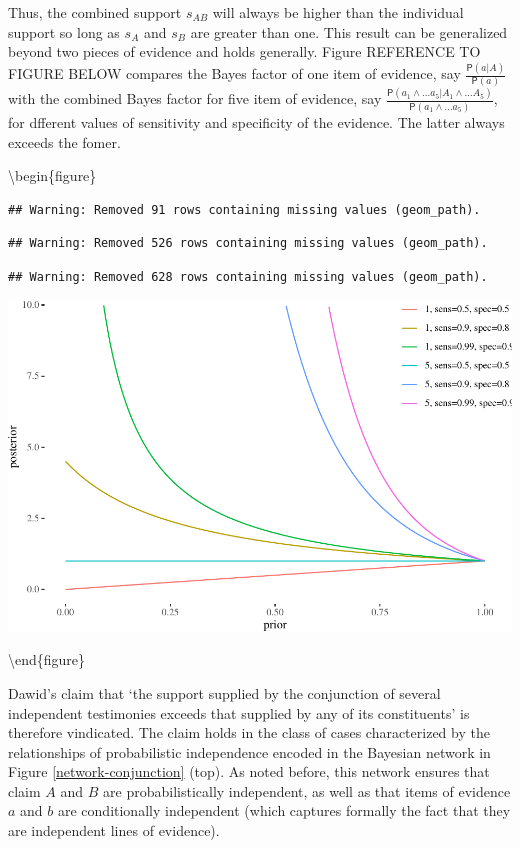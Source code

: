 \documentclass[10pt,dvipsnames,enabledeprecatedfontcommands]{scrartcl}
\newcommand{\pr}[1]{\mathsf{P}(#1)}
\begin{document}
\noindent  Thus, the combined support \(s_{AB}\) will always be higher
than the individual support so long as \(s_{A}\) and \(s_{B}\) are
greater than one. This result can be generalized beyond two pieces of
evidence and holds generally. Figure REFERENCE TO FIGURE BELOW compares
the Bayes factor of one item of evidence, say
\(\frac{\pr{a \vert A}}{\pr{a}}\) with the combined Bayes factor for
five item of evidence, say
\(\frac{\pr{a_1 \wedge \dots a_5 \vert A_1 \wedge \dots A_5}}{\pr{a_1\wedge \dots a_5}}\),
for dfferent values of sensitivity and specificity of the evidence. The
latter always exceeds the fomer.

\textbackslash{}begin\{figure\}

\begin{verbatim}
## Warning: Removed 91 rows containing missing values (geom_path).
\end{verbatim}

\begin{verbatim}
## Warning: Removed 526 rows containing missing values (geom_path).
\end{verbatim}

\begin{verbatim}
## Warning: Removed 628 rows containing missing values (geom_path).
\end{verbatim}

\begin{center}\includegraphics[width=0.9\linewidth]{conjunction-paradox_files/figure-latex/unnamed-chunk-5-1} \end{center}

\textbackslash{}end\{figure\}

Dawid's claim that `the support supplied by the conjunction of several
independent testimonies exceeds that supplied by any of its
constituents' is therefore vindicated. The claim holds in the class of
cases characterized by the relationships of probabilistic independence
encoded in the Bayesian network in Figure \ref{network-conjunction}
(top). As noted before, this network ensures that claim \(A\) and \(B\)
are probabilistically independent, as well as that items of evidence
\(a\) and \(b\) are conditionally independent (which captures formally
the fact that they are independent lines of evidence).
\end{document}
